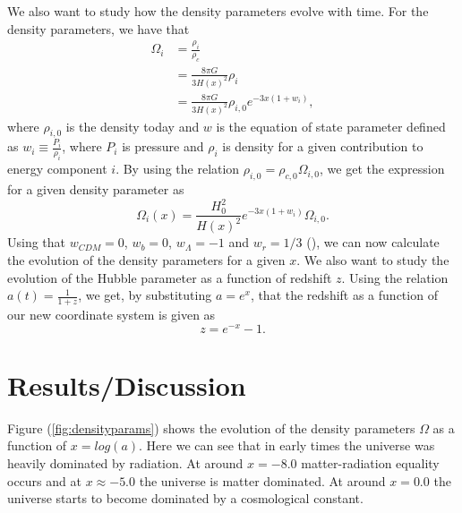 \documentclass[onecolumn]{aastex62}
\begin{document}
We also want to study how the density parameters evolve with time. For the density parameters, we
have that 
\begin{align}
    \Omega_i &= \frac{\rho_i}{\rho_{c}} \\
             &= \frac{8\pi G}{3H(x)^2}\rho_i\\
             &= \frac{8\pi G}{3H(x)^2}\rho_{i,0}e^{-3x(1+w_i)},
\end{align}
where $\rho_{i,0}$ is the density today and $w$ is the equation of state parameter defined as $w_i\equiv\frac{P_i}{\rho_i}$, where $P_i$ is pressure and
$\rho_i$ is density for a given contribution to energy component $i$. By using the relation $\rho_{i,0} = \rho_{c,0}\Omega_{i,0}$, we get the
expression for a given density parameter as 
\begin{equation}
    \Omega_i(x)=\frac{H_0^2}{H(x)^2}e^{-3x(1+w_i)}\Omega_{i,0}.
\end{equation}
Using that $w_{CDM} = 0$, $w_{b} = 0$, $w_{\Lambda} = -1$ and $w_{r} = 1/3$
(\cite{Winther:2020}), we can now calculate the evolution of the density parameters for a given
$x$. We also want to study the evolution of the Hubble parameter as a function of redshift $z$. Using the relation $a(t) = \frac{1}{1+z}$,
we get, by substituting $a = e^x$, that the redshift as a function of our new
coordinate system is given as
\begin{equation}
    z = e^{-x} - 1.
\end{equation}

\section{Results/Discussion} \label{sec:results}
Figure (\ref{fig:densityparams}) shows the evolution of the density parameters
$\Omega$ as a function of $x=log(a)$. Here we can see that in early times the
universe was heavily dominated by radiation. At around $x=-8.0$ matter-radiation
equality occurs and at $x\approx-5.0$ the universe is matter dominated. At
around $x=0.0$ the universe starts to become dominated by a cosmological constant.
\end{document}
